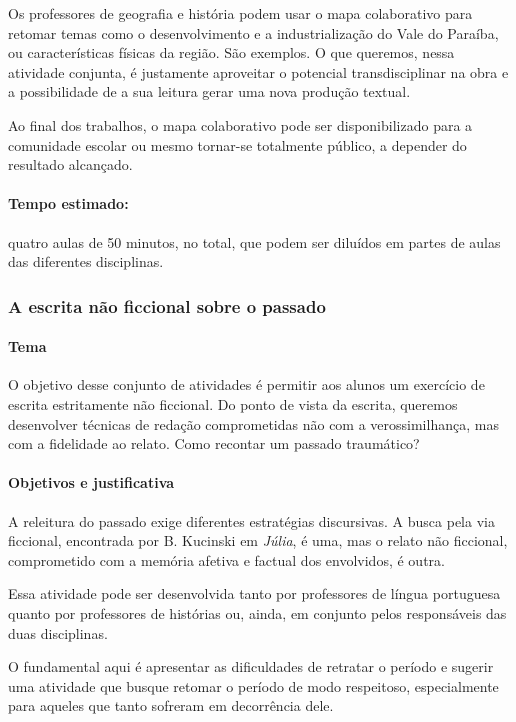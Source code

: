 \documentclass[12pt]{extarticle}
\begin{document}

Os professores de geografia e história podem usar o mapa colaborativo
para retomar temas como o desenvolvimento e a industrialização do Vale
do Paraíba, ou características físicas da região. São exemplos. O que
queremos, nessa atividade conjunta, é justamente aproveitar o potencial
transdisciplinar na obra e a possibilidade de a sua leitura gerar uma
nova produção textual.

Ao final dos trabalhos, o mapa colaborativo pode ser disponibilizado
para a comunidade escolar ou mesmo tornar-se totalmente público, a
depender do resultado alcançado.

\paragraph{Tempo estimado:} quatro aulas de 50 minutos, no total, que podem
ser diluídos em partes de aulas das diferentes disciplinas.

\subsubsection{A escrita não ficcional sobre o passado}


\paragraph{Tema}

O objetivo desse conjunto de atividades é permitir aos alunos um
exercício de escrita estritamente não ficcional. Do ponto de vista da
escrita, queremos desenvolver técnicas de redação comprometidas não com
a verossimilhança, mas com a fidelidade ao relato. Como recontar um
passado traumático?

\paragraph{Objetivos e justificativa}

A releitura do passado exige diferentes estratégias discursivas. A busca
pela via ficcional, encontrada por B. Kucinski em \emph{Júlia}, é uma,
mas o relato não ficcional, comprometido com a memória afetiva e factual
dos envolvidos, é outra.

Essa atividade pode ser desenvolvida tanto por professores de língua
portuguesa quanto por professores de histórias ou, ainda, em conjunto
pelos responsáveis das duas disciplinas.

O fundamental aqui é apresentar as dificuldades de retratar o período e
sugerir uma atividade que busque retomar o período de modo respeitoso,
especialmente para aqueles que tanto sofreram em decorrência dele.
\end{document}
